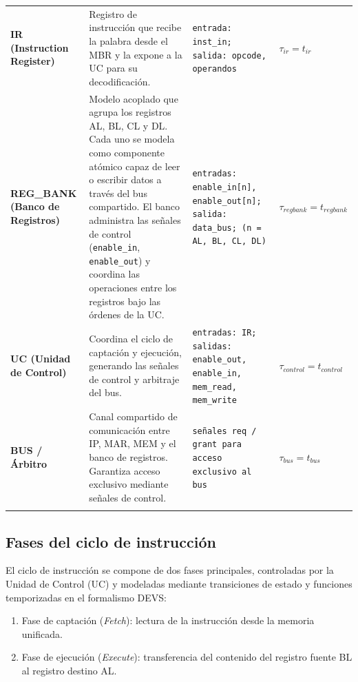 \documentclass[12pt,oneside]{templates/unerthesis}
\begin{document}
\begin{table}[!h]
{\begin{tabular}[t]{>{\raggedright\arraybackslash}p{5cm}|>{\raggedright\arraybackslash}p{8cm}>{\raggedright\arraybackslash}p{8cm}>{\raggedright\arraybackslash}p{3cm}}
\addlinespace[10pt]
\textbf{IR (Instruction Register)} & Registro de instrucción que recibe la palabra desde el MBR y la expone a la UC para su decodificación. & \texttt{entrada: inst\_in; salida: opcode, operandos} & \textbf{$\tau_{ir} = t_{ir}$}\\
\addlinespace[10pt]
\addlinespace
\textbf{REG\_BANK (Banco de Registros)} & Modelo acoplado que agrupa los registros AL, BL, CL y DL. Cada uno se modela como componente atómico capaz de leer o escribir datos a través del bus compartido. El banco administra las señales de control (\texttt{enable\_in}, \texttt{enable\_out}) y coordina las operaciones entre los registros bajo las órdenes de la UC. & \texttt{entradas: enable\_in[n], enable\_out[n]; salida: data\_bus; (n = AL, BL, CL, DL)} & \textbf{$\tau_{regbank} = t_{regbank}$}\\
\addlinespace[10pt]
\textbf{UC (Unidad de Control)} & Coordina el ciclo de captación y ejecución, generando las señales de control y arbitraje del bus. & \texttt{entradas: IR; salidas: enable\_out, enable\_in, mem\_read, mem\_write} & \textbf{$\tau_{control} = t_{control}$}\\
\addlinespace[10pt]
\textbf{BUS / Árbitro} & Canal compartido de comunicación entre IP, MAR, MEM y el banco de registros. Garantiza acceso exclusivo mediante señales de control. & \texttt{señales req / grant para acceso exclusivo al bus} & \textbf{$\tau_{bus} = t_{bus}$}\\
\addlinespace[10pt]
\bottomrule
\end{tabular}}
\end{table}

\hypertarget{fases-del-ciclo-de-instrucciuxf3n}{%
\subsection{Fases del ciclo de instrucción}\label{fases-del-ciclo-de-instrucciuxf3n}}

El ciclo de instrucción se compone de dos fases principales, controladas por la Unidad de Control (UC) y modeladas mediante transiciones de estado y funciones temporizadas en el formalismo DEVS:

\begin{enumerate}
\def\labelenumi{\arabic{enumi}.}
\item
  Fase de captación (\emph{Fetch}): lectura de la instrucción desde la memoria unificada.
\item
  Fase de ejecución (\emph{Execute}): transferencia del contenido del registro fuente BL al registro destino AL.
\end{enumerate}
\end{document}
